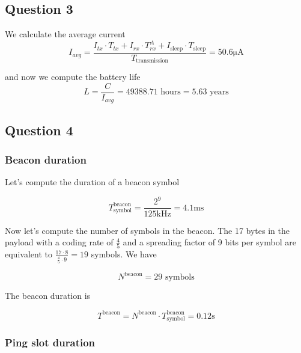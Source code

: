 \documentclass[]{article}
\begin{document}
	\subsection*{Question 3}
	
	We calculate the average current
	\begin{equation}
		I_{avg} = \frac{I_{tx} \cdot T_{tx} + I_{rx} \cdot T_{rx}^A + I_{\text{sleep}} \cdot T_{\text{sleep}}}{T_{\text{transmission}}} = 50.6 \mathrm{\mu A}
	\end{equation}
	
	and now we compute the battery life
	\begin{equation}
		L = \frac{C}{I_{avg}} = 49388.71 \text{ hours} = 5.63 \text{ years}
	\end{equation}
	
	\subsection*{Question 4}
	
	\subsubsection*{Beacon duration}
	
	Let's compute the duration of a beacon symbol
	
	\begin{equation}
		T_{\text{symbol}}^{\text{beacon}} = \frac{2^{9}}{125\text{kHz}} = 4.1\text{ms}
	\end{equation}
	
	Now let's compute the number of symbols in the beacon. The 17 bytes in the payload with a coding rate of $\frac{4}{5}$ and a spreading factor of 9 bits per symbol are equivalent to $\frac{17 \cdot 8}{\frac{4}{5} \cdot 9} = 19$ symbols. We have
	
	\begin{equation}
		N^{\text{beacon}} = 29\text{ symbols}
	\end{equation}
	
	The beacon duration is 
	
	\begin{equation}
		T^{\text{beacon}} = N^{\text{beacon}} \cdot T_{\text{symbol}}^{\text{beacon}} = 0.12\text{s}
	\end{equation}
	
	\subsubsection*{Ping slot duration}
	
\end{document}
